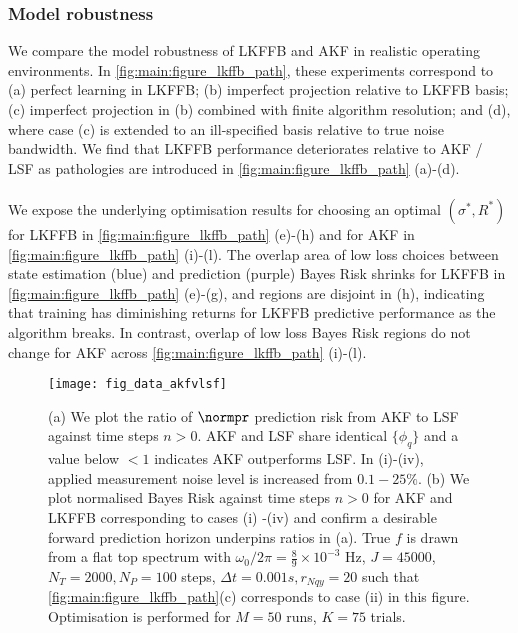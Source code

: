 \subsubsection{Model robustness}
We compare the model robustness of LKFFB and AKF in realistic operating environments. In \cref{fig:main:figure_lkffb_path}, these experiments correspond to (a) perfect learning in LKFFB; (b) imperfect projection relative to LKFFB basis; (c) imperfect projection in (b) combined with finite algorithm resolution; and (d), where case (c)  is extended to an ill-specified basis relative to true noise bandwidth. We find that LKFFB performance deteriorates relative to AKF / LSF as pathologies are introduced in \cref{fig:main:figure_lkffb_path} (a)-(d). 
\\
\\
We expose the underlying optimisation results for choosing an optimal $(\sigma^*, R^*)$ for LKFFB in \cref{fig:main:figure_lkffb_path} (e)-(h) and for AKF in \cref{fig:main:figure_lkffb_path} (i)-(l). The overlap area of low loss choices between state estimation (blue) and prediction (purple) Bayes Risk shrinks for LKFFB in \cref{fig:main:figure_lkffb_path} (e)-(g), and regions are disjoint in (h), indicating that training has diminishing returns for LKFFB predictive performance as the algorithm breaks. In contrast, overlap of low loss Bayes Risk regions do not change for AKF across \cref{fig:main:figure_lkffb_path} (i)-(l).

\begin{figure}
    \texttt{[image: fig\_data\_akfvlsf]}
    \caption{\label{fig:main:fig_data_akfvlsf} (a) We plot the ratio of $\normpr$ prediction risk from AKF to LSF against time steps $n>0$.  AKF and LSF share identical $\{ \phi_q \}$ and  a value below $<1$ indicates AKF outperforms LSF. In (i)-(iv), applied measurement noise level is increased from $0.1 - 25 \%$. (b) We plot normalised Bayes Risk against time steps $n>0$ for AKF and LKFFB corresponding to cases (i) -(iv) and confirm a desirable forward prediction horizon underpins ratios in (a). True $f$ is drawn from a flat top spectrum with $\omega_0 / 2\pi = \frac{8}{9} \times 10^{-3}$ Hz, $J = 45000$, $N_T = 2000, N_P = 100$ steps, $\Delta t = 0.001s, r_{Nqy}=20$ such that \cref{fig:main:figure_lkffb_path}(c) corresponds to case (ii) in this figure. Optimisation is performed for $M=50$ runs, $K=75$ trials.}
\end{figure}

